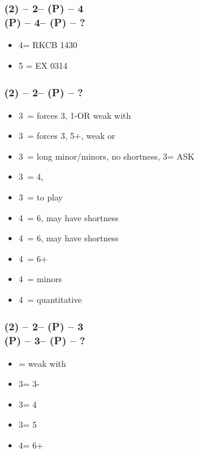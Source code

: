 \subsubsection*{(2\hearts) -- 2\nt -- (P) -- 4\hearts \\
                (P) -- 4\spades -- (P) -- ?}
\begin{itemize}
    \item 4\nt = RKCB 1430
    \item 5 = EX 0314
\end{itemize}

\subsubsection*{(2\spades) -- 2\nt -- (P) -- ?}
\begin{itemize}
    \item 3\clubs\ = forces 3\diams, 1-\spades \gf OR weak with \diams
    \item 3\diams\ = forces 3\hearts, 5+\hearts, weak or \gf
    \item 3\hearts\ = long minor/minors, no \spades shortness, 3\spades = ASK
    \item 3\spades\ = 4\hearts, \gf
    \item 3\nt\ = to play
    \item 4\clubs\ = 6\hearts, may have shortness
    \item 4\diams\ = 6\hearts, may have shortness
    \item 4\hearts\ = 6+\hearts
    \item 4\spades\ = minors
    \item 4\nt\ = quantitative
\end{itemize}

\subsubsection*{(2\spades) -- 2\nt -- (P) -- 3\clubs \\
                (P) -- 3\diams -- (P) -- ?}
\begin{itemize}
    \item \pass = weak with \diams
    \item 3\hearts = 3-\hearts
    \item 3\spades = 4\hearts
    \item 3\nt = 5\hearts
    \item 4\clubs = 6+\hearts
\end{itemize}


